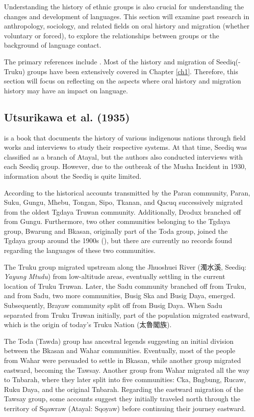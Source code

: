 Understanding the history of ethnic groups is also crucial for understanding the changes and development of languages. This section will examine past research in anthropology, sociology, and related fields on oral history and migration (whether voluntary or forced), to explore the relationships between groups or the background of language contact. 

The primary references include \textcites{utsurikawaetal1935}{liao1977Sedtheruy}{liao1978Sedtheruy}{yap2023}. Most of the history and migration of Seediq(-Truku) groups have been extensively covered in Chapter \ref{ch1}. Therefore, this section will focus on reflecting on the aspects where oral history and migration history may have an impact on language.

\subsection{Utsurikawa et al. (1935)}

\textcite{utsurikawaetal1935} is a book that documents the history of various indigenous nations through field works and interviews to study their respective systems. At that time, Seediq was classified as a branch of Atayal, but the authors also conducted interviews with each Seediq group. However, due to the outbreak of the Musha Incident in 1930, information about the Seediq is quite limited.

According to the historical accounts transmitted by the Paran community, Paran, Suku, Gungu, Mhebu, Tongan, Sipo, Tkanan, and Qacuq successively migrated from the oldest Tgdaya Truwan community. Additionally, Drodux branched off from Gungu. Furthermore, two other communities belonging to the Tgdaya group, Bwarung and Bkasan, originally part of the Toda group, joined the Tgdaya group around the 1900s (\cite[146--157]{TengChian2023musha}), but there are currently no records found regarding the languages of these two communities.

The Truku group migrated upstream along the Jhuoshuei River (濁水溪, Seediq: \textit{Yayung Mtudu}) from low-altitude areas, eventually settling in the current location of Truku Truwan. Later, the Sadu community branched off from Truku, and from Sadu, two more communities, Busig Ska and Busig Daya, emerged. Subsequently, Brayaw community split off from Busig Daya. When Sadu separated from Truku Truwan initially, part of the population migrated eastward, which is the origin of today's Truku Nation (太魯閣族).

The Toda (Tawda) group has ancestral legends suggesting an initial division between the Bkasan and Wahar communities. Eventually, most of the people from Wahar were persuaded to settle in Bkasan, while another group migrated eastward, becoming the Tawsay. Another group from Wahar migrated all the way to Tnbarah, where they later split into five communities: Cka, Bngbung, Rucaw, Ruku Daya, and the original Tnbarah. Regarding the eastward migration of the Tawsay group, some accounts suggest they initially traveled north through the territory of Sqawraw (Atayal: Sqoyaw) before continuing their journey eastward.


